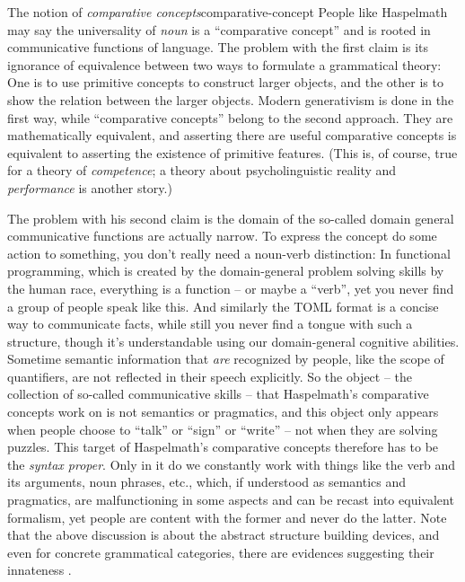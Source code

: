 \documentclass[UTF8, a4paper, oneside, scheme=plain]{ctexrep}
\newcommand*{\term}[1]{\emph{#1}}
\begin{document}
\begin{theorybox}{The notion of \term{comparative concepts}}{comparative-concept}
    People like Haspelmath may say the universality of \term{noun} 
    is a ``comparative concept'' and is rooted in communicative functions of language.
    The problem with the first claim is its ignorance of equivalence between 
    two ways to formulate a grammatical theory:
    One is to use primitive concepts to construct larger objects,
    and the other is to show the relation between the larger objects.
    Modern generativism is done in the first way,
    while ``comparative concepts'' belong to the second approach.
    They are mathematically equivalent,
    and asserting there are useful comparative concepts 
    is equivalent to asserting the existence of primitive features.
    (This is, of course, true for a theory of \emph{competence};
    a theory about psycholinguistic reality and \emph{performance} is another story.)

    The problem with his second claim is the domain of 
    the so-called domain general communicative functions 
    are actually narrow.
    To express the concept do some action to something,
    you don't really need a noun-verb distinction:
    In functional programming, which is created by the domain-general problem solving skills by the human race,
    everything is a function -- or maybe a ``verb'',
    yet you never find a group of people speak like this.
    And similarly the TOML format is a concise way to communicate facts,
    while still you never find a tongue with such a structure,
    though it's understandable using our domain-general cognitive abilities.
    Sometime semantic information that \emph{are} recognized by people,
    like the scope of quantifiers, 
    are not reflected in their speech explicitly.
    So the object -- the collection of so-called communicative skills -- 
    that Haspelmath's comparative concepts work on 
    is not semantics or pragmatics,
    and this object only appears when people choose to ``talk'' or ``sign'' or ``write''
    -- not when they are solving puzzles.
    This target of Haspelmath's comparative concepts therefore has to be the \emph{syntax proper}.
    Only in it do we constantly work with things like the verb and its arguments,
    noun phrases, etc., 
    which, if understood as semantics and pragmatics,
    are malfunctioning in some aspects
    and can be recast into equivalent formalism,
    yet people are content with the former 
    and never do the latter.
    Note that the above discussion is about the abstract structure building devices,
    and even for concrete grammatical categories,
    there are evidences suggesting their innateness \citep{satik2022cartography}.
\end{theorybox}
\end{document}
